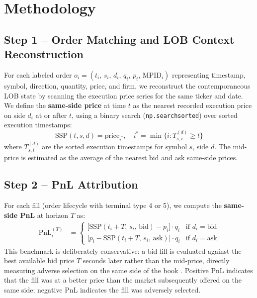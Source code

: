\documentclass[11pt, letterpaper]{article}
\begin{document}
\section{Methodology}

\subsection{Step 1 -- Order Matching and LOB Context Reconstruction}

For each labeled order $o_i = (t_i,\, s_i,\, d_i,\, q_i,\, p_i,\, \text{MPID}_i)$
representing timestamp, symbol, direction, quantity, price, and firm,
we reconstruct the contemporaneous LOB state by scanning the execution
price series for the same ticker and date.
We define the \textbf{same-side price} at time $t$ as the nearest recorded
execution price on side $d_i$ at or after $t$, using a binary search
(\texttt{np.searchsorted}) over sorted execution timestamps:
\begin{equation}
  \text{SSP}(t, s, d) = \text{price}_{i^*}, \quad
  i^* = \min\bigl\{i : T^{(d)}_{s,i} \ge t\bigr\}
\end{equation}
where $T^{(d)}_{s,i}$ are the sorted execution timestamps for symbol $s$,
side $d$.
The mid-price is estimated as the average of the nearest bid and ask same-side
prices.

\subsection{Step 2 -- PnL Attribution}

For each fill (order lifecycle with terminal type 4 or 5), we compute the
\textbf{same-side PnL} at horizon $T$ as:
\begin{align}
  \text{PnL}^{(T)}_i &= \begin{cases}
    \bigl[\text{SSP}(t_i + T,\, s_i,\, \text{bid}) - p_i\bigr] \cdot q_i
      & \text{if } d_i = \text{bid} \\[4pt]
    \bigl[p_i - \text{SSP}(t_i + T,\, s_i,\, \text{ask})\bigr] \cdot q_i
      & \text{if } d_i = \text{ask}
  \end{cases}
\end{align}
This benchmark is deliberately conservative: a bid fill is evaluated against
the best available bid price $T$ seconds later rather than the mid-price,
directly measuring adverse selection on the same side of the book
\citep{Bessembinder2003}.
Positive PnL indicates that the fill was at a better price than the market
subsequently offered on the same side; negative PnL indicates the fill was
adversely selected.
\end{document}
